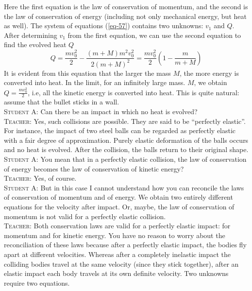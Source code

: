\documentclass[a4paper,sfsidenotes]{tufte-book}
\begin{document}
Here the first equation is the law of conservation of momentum, and the second is the law of conservation of energy (including not only mechanical energy, but heat as well). The system of equations (\ref{eq-57}) contains two unknowns: $v_{1}$ and $Q$. After determining $v_{1}$ from the first equation, we can use the second equation to find the evolved heat $Q$
\\
\begin{equation} 
Q = \frac{mv_{0}^{2}}{2} - \frac{(m+M)m^{2}v_{0}^{2}}{2(m+M)^{2}} =  \frac{mv_{0}^{2}}{2} \left( 1 - \frac{m}{m+M}\right)
\label{eq-58}
\end{equation}
It is evident from this equation that the larger the mass $M$, the more energy is converted into heat. In the limit, for an infinitely large mass. $M$, we obtain $Q=\frac{m v_{0}^{2}}{2}$, i.e, all the
kinetic energy is converted into heat. This is quite natural: assume that the bullet sticks in a wall.
\\
\textsc{Student A:} Can there be an impact in which no heat is evolved?
\\
\textsc{Teacher:} Yes, such collisions are possible. They are said to be ``perfectly elastic''. For instance, the impact of two steel balls can be regarded as perfectly elastic with a fair degree of approximation. Purely elastic deformation of the balls occurs and no heat is evolved. After the collision, the balls return to their original shape.
\\
\textsc{Student A:} You mean that in a perfectly elastic collision, the law of conservation of energy becomes the law of conservation of kinetic energy?
\\
\textsc{Teacher:} Yes, of course.
\\
\textsc{Student A:} But in this case I cannot understand how you can reconcile the laws of conservation of momentum and of energy. We obtain two entirely different equations for the velocity after impact. Or, maybe, the law of conservation of momentum is not valid for a perfectly elastic collision.
\\
\textsc{Teacher:} Both conservation laws are valid for a perfectly elastic impact: for momentum and for kinetic energy. You have no reason to worry about the reconciliation of these laws because after a perfectly elastic impact, the bodies fly apart at different velocities. Whereas after a completely inelastic
impact the colliding bodies travel at the same velocity (since they stick together), after an elastic impact each body travels at its own definite velocity. Two unknowns require two equations. 
\end{document}
